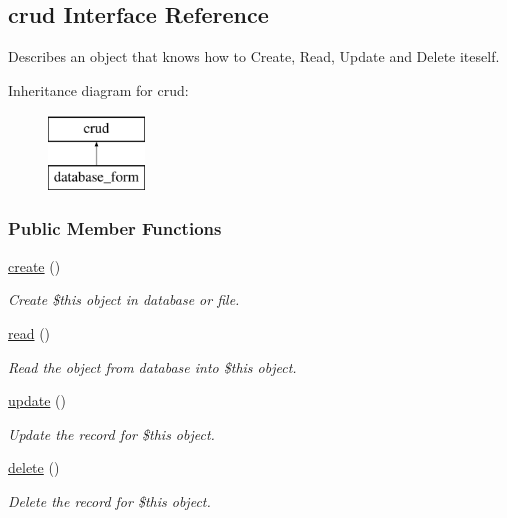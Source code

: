 \hypertarget{interfacecrud}{\subsection{crud Interface Reference}
\label{interfacecrud}
}


Describes an object that knows how to Create, Read, Update and Delete iteself.  


Inheritance diagram for crud\-:\begin{figure}[H]
\begin{center}
\leavevmode
\includegraphics[height=2.000000cm]{interfacecrud}
\end{center}
\end{figure}
\subsubsection*{Public Member Functions}
\begin{DoxyCompactItemize}
\item 
\hyperlink{interfacecrud_aef5aaa8df2d390d2a96118dd3411fd1d}{create} ()
\begin{DoxyCompactList}\small\item\em Create \$this object in database or file. \end{DoxyCompactList}\item 
\hyperlink{interfacecrud_a9cbe80658a42208cee8825ad2a0db457}{read} ()
\begin{DoxyCompactList}\small\item\em Read the object from database into \$this object. \end{DoxyCompactList}\item 
\hyperlink{interfacecrud_a7e58697e70dc818f35ea1f548641a30d}{update} ()
\begin{DoxyCompactList}\small\item\em Update the record for \$this object. \end{DoxyCompactList}\item 
\hyperlink{interfacecrud_a1e74e05aa1d6785caadb51164df38f3b}{delete} ()
\begin{DoxyCompactList}\small\item\em Delete the record for \$this object. \end{DoxyCompactList}\end{DoxyCompactItemize}


